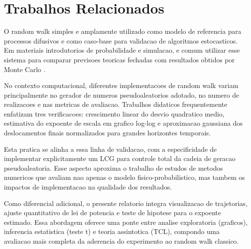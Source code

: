 
\chapter{Trabalhos Relacionados}
\label{chap_trabalhos_relacionados}

O random walk simples e amplamente utilizado como modelo de referencia para processos difusivos e como caso-base para validacao de algoritmos estocasticos. Em materiais introdutorios de probabilidade e simulacao, e comum utilizar esse sistema para comparar previsoes teoricas fechadas com resultados obtidos por Monte Carlo \cite{mathworld_random_walk_1d,mathworld_binomial_distribution}.

No contexto computacional, diferentes implementacoes de random walk variam principalmente no gerador de numeros pseudoaleatorios adotado, no numero de realizacoes e nas metricas de avaliacao. Trabalhos didaticos frequentemente enfatizam tres verificacoes: crescimento linear do desvio quadratico medio, estimativa do expoente de escala em grafico log-log e aproximacao gaussiana dos deslocamentos finais normalizados para grandes horizontes temporais.

Esta pratica se alinha a essa linha de validacao, com a especificidade de implementar explicitamente um LCG para controle total da cadeia de geracao pseudoaleatoria. Esse aspecto aproxima o trabalho de estudos de metodos numericos que avaliam nao apenas o modelo fisico-probabilistico, mas tambem os impactos de implementacao na qualidade dos resultados.

Como diferencial adicional, o presente relatorio integra visualizacao de trajetorias, ajuste quantitativo de lei de potencia e teste de hipotese para o expoente estimado. Essa abordagem oferece uma ponte entre analise exploratoria (graficos), inferencia estatistica (teste t) e teoria assintotica (TCL), compondo uma avaliacao mais completa da aderencia do experimento ao random walk classico.
